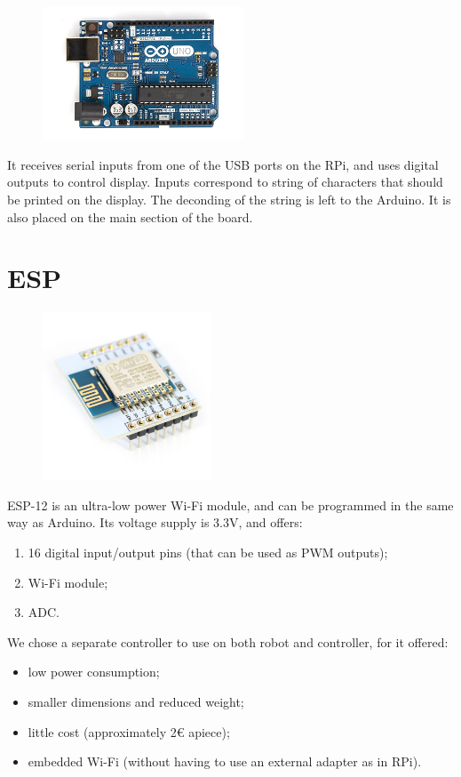 \documentclass[a4paper,twoside]{book}
\begin{document}
\begin{appendices}
\begin{figure}
    \centering
    \includegraphics[width=6cm]{img/ArduinoUno}
\end{figure}

It receives serial inputs from one of the USB ports on the RPi, and uses digital outputs to control display. Inputs correspond to string of characters that should be printed on the display. The deconding of the string is left to the Arduino. 
It is also placed on the main section of the board.

\section{ESP}
\label{app:ESP}

\begin{figure}[h]
    \centering
    \includegraphics[width=5cm]{img/ESP12}
\end{figure}

\beforelist* ESP-12  is an ultra-low power Wi-Fi module, and can be programmed in the same way as Arduino. Its voltage supply is 3.3V, and offers:
\begin{enumerate}
\item 16 digital input/output pins (that can be used as PWM outputs);
\item Wi-Fi module;
\item ADC.
\end{enumerate}
\afterlist
\beforelist We chose a separate controller to use on both robot and controller, for it offered:
\begin{itemize}
\item low power consumption; 
\item smaller dimensions and reduced weight;
\item little cost (approximately 2\euro{} apiece);
\item embedded Wi-Fi (without having to use an external adapter as in RPi).
\end{itemize}
\afterlist*


\end{appendices}
\end{document}
